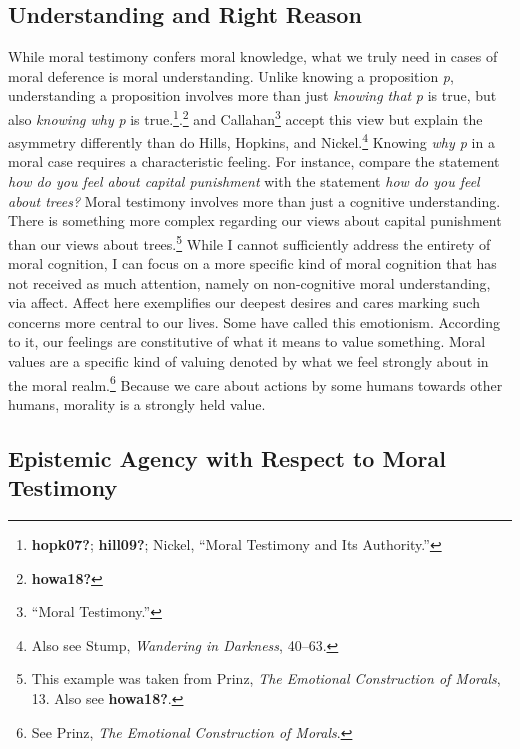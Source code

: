 \documentclass[phdthesis,12pt,final]{wuthesis}
\theoremstyle{definition}
\theoremstyle{definition}
\theoremstyle{definition}
\theoremstyle{definition}
\theoremstyle{remark}
\begin{document}
\subsection*{Understanding and Right Reason}\label{understanding-and-right-reason}

While moral testimony confers moral knowledge, what we truly need in cases of moral deference is moral understanding. Unlike knowing a proposition \emph{p}, understanding a proposition involves more than just \emph{knowing that} \emph{p} is true, but also \emph{knowing why} \emph{p} is true.\footnote{\textbf{hopk07?}; \textbf{hill09?}; Nickel, {``Moral {Testimony} and Its {Authority}.''}}.\footnote{\textbf{howa18?}} and Callahan\footnote{{``Moral {Testimony}.''}} accept this view but explain the asymmetry differently than do Hills, Hopkins, and Nickel.\footnote{Also see Stump, \emph{Wandering in {Darkness}}, 40--63.} Knowing \emph{why p} in a moral case requires a characteristic feeling. For instance, compare the statement \emph{how do you feel about capital punishment} with the statement \emph{how do you feel about trees?} Moral testimony involves more than just a cognitive understanding. There is something more complex regarding our views about capital punishment than our views about trees.\footnote{This example was taken from Prinz, \emph{The {Emotional Construction} of {Morals}}, 13. Also see \textbf{howa18?}.} While I cannot sufficiently address the entirety of moral cognition, I can focus on a more specific kind of moral cognition that has not received as much attention, namely on non-cognitive moral understanding, via affect. Affect here exemplifies our deepest desires and cares marking such concerns more central to our lives. Some have called this emotionism. According to it, our feelings are constitutive of what it means to value something. Moral values are a specific kind of valuing denoted by what we feel strongly about in the moral realm.\footnote{See Prinz, \emph{The {Emotional Construction} of {Morals}}.} Because we care about actions by some humans towards other humans, morality is a strongly held value.

\subsection*{Epistemic Agency with Respect to Moral Testimony}\label{epistemic-agency-with-respect-to-moral-testimony}
\end{document}
